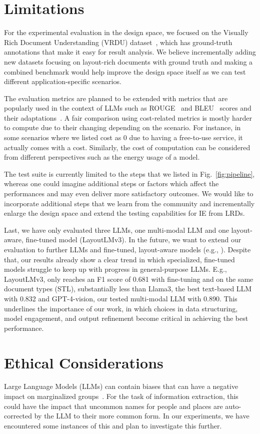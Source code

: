 \section*{Limitations}
\label{sec:limitations}

For the experimental evaluation in the design space, we focused on the Visually Rich Document Understanding (VRDU) dataset~\cite{wang2023vrdu}, which has ground-truth annotations that make it easy for result analysis. We believe incrementally adding new datasets focusing on layout-rich documents with ground truth and making a combined benchmark would help improve the design space itself as we can test different application-specific scenarios. 

The evaluation metrics are planned to be extended with metrics that are popularly used in the context of LLMs such as ROUGE~\cite{lin2004rouge} and BLEU~\cite{papineni2002bleu} scores and their adaptations~\cite{yang2018adaptations}. A fair comparison using cost-related metrics is mostly harder to compute due to their changing depending on the scenario. For instance, in some scenarios where we listed cost as 0 due to having a free-to-use service, it actually comes with a cost. Similarly, the cost of computation can be considered from different perspectives such as the energy usage of a model. 

The test suite is currently limited to the steps that we listed in Fig.~\ref{fig:pipeline}, whereas one could imagine additional steps or factors which affect the performances and may even deliver more satisfactory outcomes. We would like to incorporate additional steps that we learn from the community and incrementally enlarge the design space and extend the testing capabilities for IE from LRDs.

Last, we have only evaluated three LLMs, one multi-modal LLM and one layout-aware, fine-tuned model (LayoutLMv3).
In the future, we want to extend our evaluation to further LLMs and fine-tuned, layout-aware models (e.g., ). Despite that, our results already show a clear trend in which specialized, fine-tuned models struggle to keep up with progress in general-purpose LLMs. E.g., LayoutLMv3, only reaches an F1 score of 0.681 with fine-tuning and on the same document types (STL), substantially less than Llama3, the best text-based LLM with 0.832 and GPT-4-vision, our tested multi-modal LLM with 0.890.
This underlines the importance of our work, in which choices in data structuring, model engagement, and output refinement become critical in achieving the best performance.

\section*{Ethical Considerations}
Large Language Models (LLMs) can contain biases that can have a negative impact on marginalized groups~\cite{gallegos2024bias}. For the task of information extraction, this could have the impact that uncommon names for people and places are auto-corrected by the LLM to their more common form. In our experiments, we have encountered some instances of this and plan to investigate this further.
